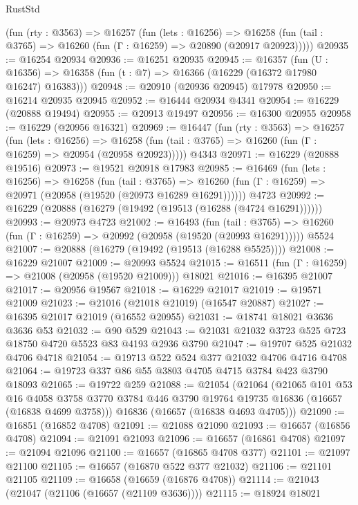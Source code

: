 \begin{lexlean}{RustStd}
\begin{coremodule}
    (fun (rty : @3563) =>
    @16257
      (fun (lets : @16256) =>
      @16258 (fun (tail : @3765) => @16260 (fun (Γ : @16259) => @20890 (@20917 @20923)))))
@20935 := @16254 @20934
@20936 := @16251 @20935
@20945 := @16357
    (fun (U : @16356) => @16358 (fun (t : @7) => @16366 (@16229 (@16372 @17980 @16247) @16383)))
@20948 := @20910 (@20936 @20945) @17978
@20950 := @16214 @20935 @20945
@20952 := @16444 @20934 @4341
@20954 := @16229 (@20888 @19494)
@20955 := @20913 @19497
@20956 := @16300 @20955
@20958 := @16229 (@20956 @16321)
@20969 := @16447
    (fun (rty : @3563) =>
    @16257
      (fun (lets : @16256) =>
      @16258 (fun (tail : @3765) => @16260 (fun (Γ : @16259) => @20954 (@20958 @20923)))))
    @4343
@20971 := @16229 (@20888 @19516)
@20973 := @19521 @20918 @17983
@20985 := @16469
    (fun (lets : @16256) =>
    @16258
      (fun (tail : @3765) =>
      @16260 (fun (Γ : @16259) => @20971 (@20958 (@19520 (@20973 @16289 @16291))))))
    @4723
@20992 := @16229 (@20888 (@16279 (@19492 (@19513 (@16288 (@4724 @16291))))))
@20993 := @20973 @4723
@21002 := @16493
    (fun (tail : @3765) => @16260 (fun (Γ : @16259) => @20992 (@20958 (@19520 (@20993 @16291)))))
    @5524
@21007 := @20888 (@16279 (@19492 (@19513 (@16288 @5525))))
@21008 := @16229 @21007
@21009 := @20993 @5524
@21015 := @16511 (fun (Γ : @16259) => @21008 (@20958 (@19520 @21009))) @18021
@21016 := @16395 @21007
@21017 := @20956 @19567
@21018 := @16229 @21017
@21019 := @19571 @21009
@21023 := @21016 (@21018 @21019) (@16547 @20887)
@21027 := @16395 @21017 @21019 (@16552 @20955)
@21031 := @18741 @18021 @3636 @3636 @53
@21032 := @90 @529
@21043 := @21031 @21032 @3723 @525 @723 @18750 @4720 @5523 @83 @4193 @2936 @3790
@21047 := @19707 @525 @21032 @4706 @4718
@21054 := @19713 @522 @524 @377 @21032 @4706 @4716 @4708
@21064 := @19723 @337 @86 @55 @3803 @4705 @4715 @3784 @423 @3790 @18093
@21065 := @19722 @259
@21088 := @21054
    (@21064
      (@21065
        @101
        @53
        @16
        @4058
        @3758
        @3770
        @3784
        @446
        @3790
        @19764
        @19735
        @16836
        (@16657 (@16838 @4699 @3758)))
      @16836
      (@16657 (@16838 @4693 @4705)))
@21090 := @16851 (@16852 @4708)
@21091 := @21088 @21090
@21093 := @16657 (@16856 @4708)
@21094 := @21091 @21093
@21096 := @16657 (@16861 @4708)
@21097 := @21094 @21096
@21100 := @16657 (@16865 @4708 @377)
@21101 := @21097 @21100
@21105 := @16657 (@16870 @522 @377 @21032)
@21106 := @21101 @21105
@21109 := @16658 (@16659 (@16876 @4708))
@21114 := @21043 (@21047 (@21106 (@16657 (@21109 @3636))))
@21115 := @18924 @18021

\end{coremodule}
\end{lexlean}
